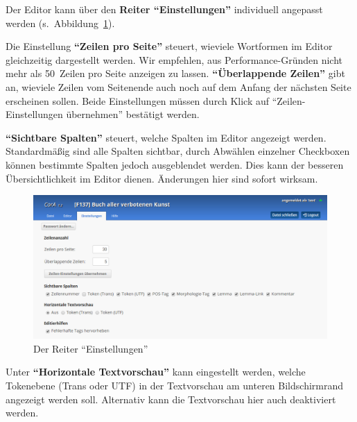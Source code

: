 \documentclass[11pt,a4paper,parskip=half]{scrartcl}
\begin{document}

Der Editor kann über den \textbf{Reiter "`Einstellungen"'} individuell angepasst
werden (s.\ Abbildung~\ref{fig:settings}).

Die Einstellung \textbf{``Zeilen pro Seite''} steuert, wieviele Wortformen im
Editor gleichzeitig dargestellt werden.  Wir empfehlen, aus Performance-Gründen
nicht mehr als 50~Zeilen pro Seite anzeigen zu lassen.  \textbf{``Überlappende
  Zeilen''} gibt an, wieviele Zeilen vom Seitenende auch noch auf dem Anfang der
nächsten Seite erscheinen sollen.  Beide Einstellungen müssen durch Klick auf
"`Zeilen-Einstellungen übernehmen"' bestätigt werden.

\textbf{``Sichtbare Spalten''} steuert, welche Spalten im Editor angezeigt
werden.  Standardmäßig sind alle Spalten sichtbar, durch Abwählen einzelner
Checkboxen können bestimmte Spalten jedoch ausgeblendet werden.  Dies kann der
besseren Übersichtlichkeit im Editor dienen.  Änderungen hier sind sofort
wirksam.

\begin{figure}[tb]
  \centering
  \includegraphics[width=\linewidth]{img/1.2/einstellungen.png}
  \caption{Der Reiter "`Einstellungen"'}
  \label{fig:settings}
\end{figure}

Unter \textbf{``Horizontale Textvorschau''} kann eingestellt werden, welche Tokenebene (Trans oder UTF) in der Textvorschau am unteren Bildschirmrand angezeigt werden soll.  Alternativ kann die Textvorschau hier auch deaktiviert werden.
\end{document}
